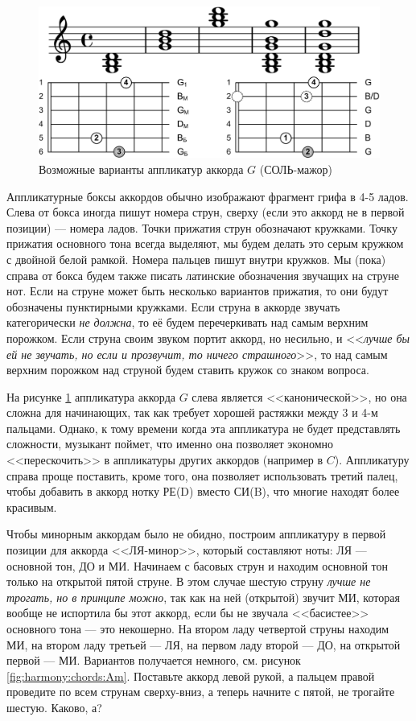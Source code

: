 \begin{figure}[!ht]
    \centering
    \includegraphics{fig/chords/G-variants} 
    \caption{Возможные варианты аппликатур аккорда $G$ (СОЛЬ-мажор)}\label{fig:harmony:chords:G-variants}
\end{figure} 

Аппликатурные боксы аккордов обычно изображают фрагмент грифа в 4-5 ладов. Слева от бокса иногда пишут номера струн, сверху (если это аккорд не в первой позиции) --- номера ладов. Точки прижатия струн обозначают кружками. Точку прижатия основного тона всегда выделяют, мы будем делать это серым кружком с двойной белой рамкой. Номера пальцев пишут  внутри кружков. Мы (пока) справа от бокса будем также писать латинские обозначения звучащих на струне нот. Если на струне может быть несколько вариантов прижатия, то они будут обозначены пунктирными кружками. Если струна в аккорде звучать категорически \emph{не должна}, то её будем перечеркивать над самым верхним порожком. Если струна своим звуком портит аккорд, но несильно, и <<\emph{лучше бы ей не звучать, но если и прозвучит, то ничего страшного}>>, то над самым верхним порожком над струной будем ставить кружок со знаком вопроса.

На рисунке \ref{fig:harmony:chords:G-variants} аппликатура аккорда $G$ слева является <<канонической>>, но она сложна для начинающих, так как требует хорошей растяжки между 3 и 4-м пальцами. Однако, к тому времени когда эта аппликатура не будет представлять сложности, музыкант поймет, что именно она позволяет экономно <<перескочить>> в аппликатуры других аккордов (например в $C$). Аппликатуру справа проще поставить, кроме того, она позволяет использовать третий палец, чтобы добавить в аккорд нотку РЕ(D) вместо СИ(B), что многие находят более красивым.

Чтобы минорным аккордам было не обидно, построим аппликатуру в первой позиции для аккорда <<ЛЯ-минор>>, который составляют ноты: ЛЯ --- основной тон, ДО и МИ. Начинаем с басовых струн и находим основной тон только на открытой пятой струне. В этом случае шестую струну \emph{лучше не трогать, но в принципе можно}, так как на ней (открытой) звучит МИ, которая вообще не испортила бы этот аккорд, если бы не звучала <<басистее>> основного тона --- это некошерно. На втором ладу четвертой струны находим МИ, на втором ладу третьей --- ЛЯ, на первом ладу второй --- ДО, на открытой первой --- МИ. Вариантов получается немного, см. рисунок \ref{fig:harmony:chords:Am}. Поставьте аккорд левой рукой, а пальцем правой проведите по всем струнам сверху-вниз, а теперь начните с пятой, не трогайте шестую. Каково, а?

